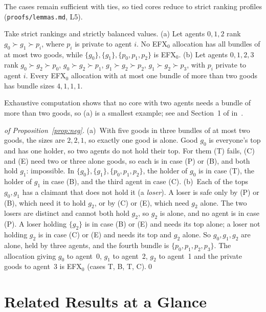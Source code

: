 \documentclass[runningheads,11pt]{llncs}
\newcommand{\efxz}{\texorpdfstring{\mbox{EFX$_0$}}{EFX0}}
\begin{document}
\noindent The cases remain sufficient with ties, so tied cores reduce to strict ranking profiles (\texttt{proofs/lemmas.md}, L5).

\begin{proposition}\label{prop:neg}
Take strict rankings and strictly balanced values.
(a) Let agents $0,1,2$ rank $g_0\succ g_1\succ p_i$, where $p_i$ is private to agent $i$. No \efxz{} allocation has all bundles of at most two goods, while $\{g_0\},\{g_1\},\{p_0,p_1,p_2\}$ is \efxz{}.
(b) Let agents $0,1,2,3$ rank $g_0\succ g_2\succ p_0$, $g_0\succ g_2\succ p_1$, $g_1\succ g_2\succ p_2$, $g_1\succ g_2\succ p_3$, with $p_i$ private to agent $i$. Every \efxz{} allocation with at most one bundle of more than two goods has bundle sizes $4,1,1,1$.
\end{proposition}

\noindent Exhaustive computation shows that no core with two agents needs a bundle of more than two goods, so (a) is a smallest example; see  and Section~1 of  in~\cite{Repo}.

\begin{proof}[of Proposition~\ref{prop:neg}]
(a)~With five goods in three bundles of at most two goods, the sizes are $2,2,1$, so exactly one good is alone. Good $g_0$ is everyone's top and has one holder, so two agents do not hold their top. For them (T) fails, (C) and (E) need two or three alone goods, so each is in case (P) or (B), and both hold $g_1$: impossible. In $\{g_0\},\{g_1\},\{p_0,p_1,p_2\}$, the holder of $g_0$ is in case (T), the holder of $g_1$ in case (B), and the third agent in case (C).
(b)~Each of the tops $g_0,g_1$ has a claimant that does not hold it (a \emph{loser}). A loser is safe only by (P) or (B), which need it to hold $g_2$, or by (C) or (E), which need $g_2$ alone. The two losers are distinct and cannot both hold $g_2$, so $g_2$ is alone, and no agent is in case (P). A loser holding $\{g_2\}$ is in case (B) or (E) and needs its top alone; a loser not holding $g_2$ is in case (C) or (E) and needs its top and $g_2$ alone. So $g_0,g_1,g_2$ are alone, held by three agents, and the fourth bundle is $\{p_0,p_1,p_2,p_3\}$. The allocation giving $g_0$ to agent~0, $g_1$ to agent~2, $g_2$ to agent~1 and the private goods to agent~3 is \efxz{} (cases T, B, T, C).\qed
\end{proof}

\section{Related Results at a Glance}\label{app:rw}
\end{document}
